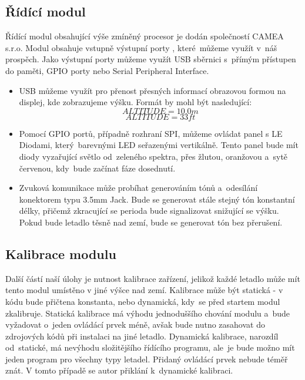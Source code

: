 			\subsection{Řídící modul}
				Řídící modul obsahující výše zmíněný procesor je dodán společností CAMEA s.r.o. Modul obsahuje vstupně výstupní porty , které~můžeme využít v~náš prospěch. Jako výstupní porty můžeme využít USB sběrnici s~přímým přístupen do paměti, GPIO porty nebo Serial Peripheral Interface. 
				\begin{itemize}
					\item USB můžeme využít pro přenost přesných informací obrazovou formou na displej, kde zobrazujeme výšku. Formát by mohl být nasledující: \[ALTITUDE = 10.0 m\]\[ALTITUDE = 33 ft\]
					
					\item Pomocí GPIO portů, případně rozhraní SPI, můžeme ovládat panel s LE Diodami, který~barevnými LED seřazenými vertikálně. Tento panel bude mít diody vyzařující světlo od~zeleného spektra, přes žlutou, oranžovou a~sytě červenou, kdy~bude začínat fáze dosednutí.
					
					\item Zvuková komunikace může probíhat generováním tónů a~odesílání konektorem typu 3.5mm Jack. Bude se generovat stále stejný tón konstantní délky, přičemž zkracující se perioda bude signalizovat snižující se výšku. Pokud bude letadlo těsně nad zemí, bude se generovat tón bez přerušení.
				\end{itemize}
			
			\subsection{Kalibrace modulu}
				Další částí naší úlohy je nutnost kalibrace zařízení, jelikož každé letadlo může mít tento modul umístěno v jiné výšce nad zemí. Kalibrace může být statická - v kódu bude přičtena konstanta, nebo dynamická, kdy~se před startem modul zkalibruje. Statická kalibrace má výhodu jednoduššího chování modulu a~bude vyžadovat o~jeden ovládácí prvek méně, avšak bude nutno zasahovat do zdrojových kódů při instalaci na jiné letadlo. Dynamická kalibrace, narozdíl od~statické, má nevýhodu složitějšího řídícího programu, ale~je bude možno mít jeden program pro všechny typy letadel. Přidaný ovládácí prvek nebude téměř znát. V tomto případě se autor přiklání k~dynamické kalibraci.
				
